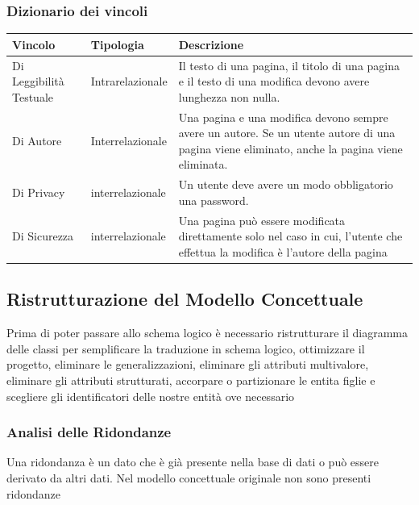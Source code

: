 \documentclass{article}
\begin{document}
{\begin{table}[H]
	
		
	\end{table}

	{\subsubsection {Dizionario dei vincoli}}
	\begin{table}[H]
		\centering
		\small %
		\setlength{\tabcolsep}{6pt} %
		\renewcommand{\arraystretch}{1.2} %
		
		
		\begin{tabularx}{\textwidth}{|l|l|X|}
			\hline
			\textbf{Vincolo} &\textbf{Tipologia}  & \textbf{Descrizione} \\
			\hline
			Di Leggibilità Testuale & Intrarelazionale & Il testo di una pagina, il titolo di una pagina e il testo di una modifica devono avere lunghezza non nulla.
			\\
			\hline
			Di Autore & Interrelazionale & Una pagina e una modifica devono sempre avere un autore. Se un utente autore di una pagina viene eliminato, anche la pagina viene eliminata.
			\\
			\hline
			Di Privacy & interrelazionale  & Un utente deve avere un modo obbligatorio una password.
			\\
			Di Sicurezza & interrelazionale  & Una pagina può essere modificata direttamente solo nel caso in cui, l'utente che effettua la modifica è l'autore della pagina
			\\
			\hline
		\end{tabularx}
		
	\end{table}
	
	\newpage
	
	{\subsection{Ristrutturazione del Modello Concettuale}}
	Prima di poter passare allo schema logico è necessario ristrutturare il diagramma delle classi per semplificare la traduzione in schema logico, ottimizzare il progetto, eliminare le generalizzazioni, eliminare gli attributi multivalore,
	eliminare gli attributi strutturati, accorpare o partizionare le entita figlie e scegliere gli identificatori delle nostre entità ove necessario
	
	{\subsubsection{Analisi delle Ridondanze}}
	Una ridondanza è un dato che è già presente nella base di dati o può essere
	derivato da altri dati.
	Nel modello concettuale originale non sono presenti ridondanze
	
}
\end{document}
